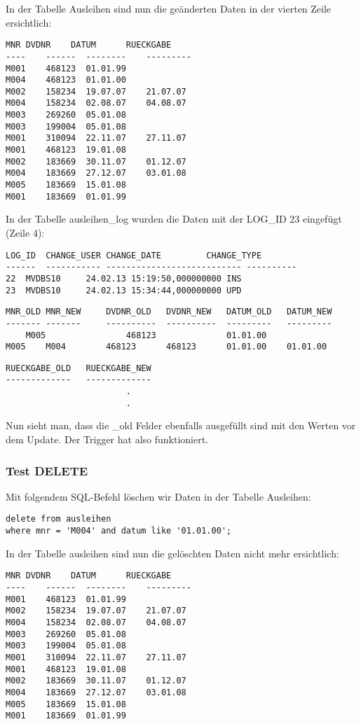 \documentclass[11pt,a4paper,parskip=half]{scrartcl}
\begin{document}
In der Tabelle Ausleihen sind nun die geänderten Daten in der vierten Zeile ersichtlich:

\begin{lstlisting}
MNR	DVDNR	 DATUM		RUECKGABE
---- 	------	-------- 	---------
M001	468123 	01.01.99	
M004	468123	01.01.00	
M002	158234 	19.07.07	21.07.07  
M004	158234 	02.08.07	04.08.07  
M003	269260 	05.01.08	
M003	199004 	05.01.08	
M001	310094 	22.11.07	27.11.07  
M001	468123 	19.01.08	
M002	183669 	30.11.07	01.12.07  
M004	183669 	27.12.07	03.01.08  
M005	183669	15.01.08	
M001	183669	01.01.99	
\end{lstlisting}

In der Tabelle ausleihen\_log wurden die Daten mit der LOG\_ID 23 eingefügt (Zeile 4):

\begin{lstlisting}
LOG_ID	CHANGE_USER	CHANGE_DATE			CHANGE_TYPE	
------	-----------	---------------------------	----------		
22	MVDBS10		24.02.13 15:19:50,000000000	INS					
23	MVDBS10		24.02.13 15:34:44,000000000	UPD					
\end{lstlisting}

\begin{lstlisting}
MNR_OLD	MNR_NEW		DVDNR_OLD	DVDNR_NEW	DATUM_OLD	DATUM_NEW	
-------	-------		----------	----------	---------	--------- 	
	M005				468123				01.01.00					
M005	M004		468123		468123		01.01.00	01.01.00				
\end{lstlisting}
\begin{lstlisting}
RUECKGABE_OLD	RUECKGABE_NEW
-------------	-------------	
						.
						.
\end{lstlisting}

Nun sieht man, dass die \_old Felder ebenfalls ausgefüllt sind mit den Werten vor dem Update. Der Trigger hat also funktioniert.

\subsubsection{Test DELETE}
Mit folgendem SQL-Befehl löschen wir Daten in der Tabelle Ausleihen:

\begin{lstlisting}
delete from ausleihen
where mnr = 'M004' and datum like '01.01.00';
\end{lstlisting}

In der Tabelle ausleihen sind nun die gelöschten Daten nicht mehr ersichtlich:
\begin{lstlisting}
MNR	DVDNR	 DATUM		RUECKGABE
---- 	------	-------- 	---------
M001	468123 	01.01.99	
M002	158234 	19.07.07	21.07.07  
M004	158234 	02.08.07	04.08.07  
M003	269260 	05.01.08	
M003	199004 	05.01.08	
M001	310094 	22.11.07	27.11.07  
M001	468123 	19.01.08	
M002	183669 	30.11.07	01.12.07  
M004	183669 	27.12.07	03.01.08  
M005	183669 	15.01.08	
M001	183669 	01.01.99	
\end{lstlisting}
\end{document}
